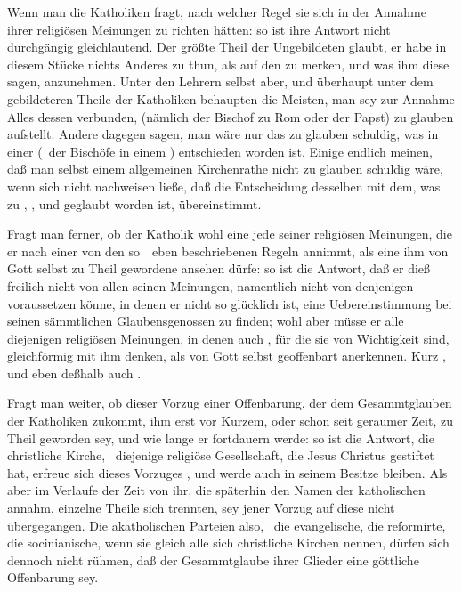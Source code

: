 \begin{aufza}
\item Wenn man die Katholiken fragt, nach welcher Regel sie sich in der Annahme ihrer religiösen Meinungen zu richten hätten: so ist ihre Antwort nicht durchgängig gleichlautend. Der größte Theil der Ungebildeten glaubt, er habe in diesem Stücke nichts Anderes zu thun, als auf den  zu merken, und was ihm diese sagen, anzunehmen. Unter den Lehrern selbst aber, und überhaupt unter dem gebildeteren Theile der Katholiken behaupten die Meisten, man sey zur Annahme Alles dessen verbunden,  (nämlich der Bischof zu Rom oder der Papst) zu glauben aufstellt. Andere dagegen sagen, man wäre nur das zu glauben schuldig, was in einer  (\dh\ der Bischöfe in einem ) entschieden worden ist. Einige endlich meinen, daß man selbst einem allgemeinen Kirchenrathe nicht zu glauben schuldig wäre, wenn sich nicht nachweisen ließe, daß die Entscheidung desselben mit dem, was zu , , und  geglaubt worden ist, übereinstimmt.
\item Fragt man ferner, ob der Katholik wohl eine jede seiner religiösen Meinungen, die er nach einer von den so~\ eben beschriebenen Regeln annimmt, als eine ihm von Gott selbst zu Theil gewordene  ansehen dürfe: so ist die Antwort, daß er dieß freilich nicht von allen seinen Meinungen, namentlich nicht von denjenigen voraussetzen könne, in denen er nicht so glücklich ist, eine Uebereinstimmung bei seinen sämmtlichen Glaubensgenossen zu finden; wohl aber müsse er alle diejenigen religiösen Meinungen, in denen auch , für die sie von Wichtigkeit sind, gleichförmig mit ihm denken, als von Gott selbst geoffenbart anerkennen. Kurz , und eben deßhalb auch .
\item Fragt man weiter, ob dieser Vorzug einer Offenbarung, der dem Gesammtglauben der Katholiken zukommt, ihm erst vor Kurzem, oder schon seit geraumer Zeit, zu Theil geworden sey, und wie lange er fortdauern werde: so ist die Antwort, die christliche Kirche, \dh\ diejenige religiöse Gesellschaft, die Jesus Christus gestiftet hat, erfreue sich dieses Vorzuges , und werde auch  in seinem Besitze bleiben. Als aber im Verlaufe der Zeit von ihr, die späterhin den Namen der katholischen annahm, einzelne Theile sich trennten, sey jener Vorzug auf diese nicht übergegangen. Die akatholischen Parteien also, \zB\ die evangelische, die reformirte, die socinianische, wenn sie gleich alle sich christliche Kirchen nennen, dürfen sich dennoch nicht rühmen, daß der Gesammtglaube ihrer Glieder eine göttliche Offenbarung sey.

\end{aufza}
